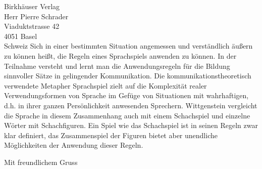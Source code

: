 \documentclass[personal,german,color]{ubletter}
\begin{document}
\begin{letter}{Birkhäuser Verlag \\ Herr Pierre Schrader \\
               Viaduktstrasse 42\\ 4051 Basel \\ Schweiz}
Sich in einer bestimmten Situation angemessen und verständlich
äußern zu können heißt, die Regeln eines Sprachspiels anwenden zu
können. In der Teilnahme versteht und lernt man die Anwendungsregeln
für die Bildung sinnvoller Sätze in gelingender Kommunikation. Die
kommunikationstheoretisch verwendete Metapher Sprachspiel zielt auf
die Komplexität realer Verwendungsformen von Sprache im Gefüge von
Situationen mit wahrhaftigen, d.h. in ihrer ganzen Persönlichkeit
anwesenden Sprechern. Wittgenstein vergleicht die Sprache in diesem
Zusammenhang auch mit einem Schachspiel und einzelne Wörter mit
Schachfiguren. Ein Spiel wie das Schachspiel ist in seinen Regeln
zwar klar definiert, das Zusammenspiel der Figuren bietet aber
unendliche Möglichkeiten der Anwendung dieser Regeln.


\closing{Mit freundlichem Gruss}									%
\end{letter}
\end{document}
